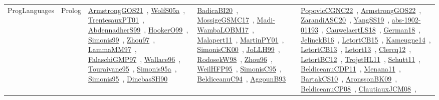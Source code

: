 {\begin{longtable}{lp{3cm}>{\raggedright\arraybackslash}p{6cm}>{\raggedright\arraybackslash}p{6cm}>{\raggedright\arraybackslash}p{8cm}}
\index{Prolog}\index{ProgLanguages!Prolog}ProgLanguages & Prolog & \href{../works/ArmstrongGOS21.pdf}{ArmstrongGOS21}~\cite{ArmstrongGOS21}, \href{../works/WolfS05a.pdf}{WolfS05a}~\cite{WolfS05a}, \href{../works/TrentesauxPT01.pdf}{TrentesauxPT01}~\cite{TrentesauxPT01}, \href{../works/AbdennadherS99.pdf}{AbdennadherS99}~\cite{AbdennadherS99}, \href{../works/HookerO99.pdf}{HookerO99}~\cite{HookerO99}, \href{../works/Simonis99.pdf}{Simonis99}~\cite{Simonis99}, \href{../works/Zhou97.pdf}{Zhou97}~\cite{Zhou97}, \href{../works/LammaMM97.pdf}{LammaMM97}~\cite{LammaMM97}, \href{../works/FalaschiGMP97.pdf}{FalaschiGMP97}~\cite{FalaschiGMP97}, \href{../works/Wallace96.pdf}{Wallace96}~\cite{Wallace96}, \href{../works/Touraivane95.pdf}{Touraivane95}~\cite{Touraivane95}, \href{../works/Simonis95a.pdf}{Simonis95a}~\cite{Simonis95a}, \href{../works/Simonis95.pdf}{Simonis95}~\cite{Simonis95}, \href{../works/DincbasSH90.pdf}{DincbasSH90}~\cite{DincbasSH90} & \href{../works/BadicaBI20.pdf}{BadicaBI20}~\cite{BadicaBI20}, \href{../works/MossigeGSMC17.pdf}{MossigeGSMC17}~\cite{MossigeGSMC17}, \href{../works/Madi-WambaLOBM17.pdf}{Madi-WambaLOBM17}~\cite{Madi-WambaLOBM17}, \href{../works/Malapert11.pdf}{Malapert11}~\cite{Malapert11}, \href{../works/MartinPY01.pdf}{MartinPY01}~\cite{MartinPY01}, \href{../works/SimonisCK00.pdf}{SimonisCK00}~\cite{SimonisCK00}, \href{../works/JoLLH99.pdf}{JoLLH99}~\cite{JoLLH99}, \href{../works/RodosekW98.pdf}{RodosekW98}~\cite{RodosekW98}, \href{../works/Zhou96.pdf}{Zhou96}~\cite{Zhou96}, \href{../works/WeilHFP95.pdf}{WeilHFP95}~\cite{WeilHFP95}, \href{../works/SimonisC95.pdf}{SimonisC95}~\cite{SimonisC95}, \href{../works/BeldiceanuC94.pdf}{BeldiceanuC94}~\cite{BeldiceanuC94}, \href{../works/AggounB93.pdf}{AggounB93}~\cite{AggounB93} & \href{../works/PopovicCGNC22.pdf}{PopovicCGNC22}~\cite{PopovicCGNC22}, \href{../works/ArmstrongGOS22.pdf}{ArmstrongGOS22}~\cite{ArmstrongGOS22}, \href{../works/ZarandiASC20.pdf}{ZarandiASC20}~\cite{ZarandiASC20}, \href{../works/YangSS19.pdf}{YangSS19}~\cite{YangSS19}, \href{../works/abs-1902-01193.pdf}{abs-1902-01193}~\cite{abs-1902-01193}, \href{../works/CauwelaertLS18.pdf}{CauwelaertLS18}~\cite{CauwelaertLS18}, \href{../works/German18.pdf}{German18}~\cite{German18}, \href{../works/JelinekB16.pdf}{JelinekB16}~\cite{JelinekB16}, \href{../works/LetortCB15.pdf}{LetortCB15}~\cite{LetortCB15}, \href{../works/Kameugne14.pdf}{Kameugne14}~\cite{Kameugne14}, \href{../works/LetortCB13.pdf}{LetortCB13}~\cite{LetortCB13}, \href{../works/Letort13.pdf}{Letort13}~\cite{Letort13}, \href{../works/Clercq12.pdf}{Clercq12}~\cite{Clercq12}, \href{../works/LetortBC12.pdf}{LetortBC12}~\cite{LetortBC12}, \href{../works/TrojetHL11.pdf}{TrojetHL11}~\cite{TrojetHL11}, \href{../works/Schutt11.pdf}{Schutt11}~\cite{Schutt11}, \href{../works/BeldiceanuCDP11.pdf}{BeldiceanuCDP11}~\cite{BeldiceanuCDP11}, \href{../works/Menana11.pdf}{Menana11}~\cite{Menana11}, \href{../works/BartakCS10.pdf}{BartakCS10}~\cite{BartakCS10}, \href{../works/AronssonBK09.pdf}{AronssonBK09}~\cite{AronssonBK09}, \href{../works/BeldiceanuCP08.pdf}{BeldiceanuCP08}~\cite{BeldiceanuCP08}, \href{../works/ClautiauxJCM08.pdf}{ClautiauxJCM08}~\cite{ClautiauxJCM08}, 
\end{longtable}}
